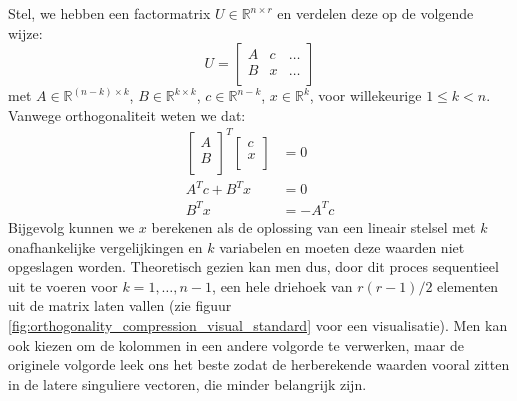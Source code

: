 Stel, we hebben een factormatrix $U \in \mathbb{R}^{n \times r}$ en verdelen deze op de volgende wijze:
\[
U = \begin{bmatrix}
A & c & \dots \\
B & x & \dots \\
\end{bmatrix}
\]
met $A \in \mathbb{R}^{(n-k) \times k}$, $B \in \mathbb{R}^{k \times k}$, $c \in \mathbb{R}^{n-k}$, $x \in \mathbb{R}^{k}$, voor willekeurige $1 \leq k < n$. Vanwege orthogonaliteit weten we dat:
\begin{align*}
\begin{bmatrix}
A \\
B \\
\end{bmatrix}^T
\begin{bmatrix}
c \\
x \\
\end{bmatrix}
&= 0 \\
A^T c + B^T x &= 0 \\
B^T x &= -A^T c
\end{align*}
Bijgevolg kunnen we $x$ berekenen als de oplossing van een lineair stelsel met $k$ onafhankelijke vergelijkingen en $k$ variabelen en moeten deze waarden niet opgeslagen worden. Theoretisch gezien kan men dus, door dit proces sequentieel uit te voeren voor $k = 1, \dots, n - 1$, een hele driehoek van $r (r - 1)/2$ elementen uit de matrix laten vallen (zie figuur \ref{fig:orthogonality_compression_visual_standard} voor een visualisatie). Men kan ook kiezen om de kolommen in een andere volgorde te verwerken, maar de originele volgorde leek ons het beste zodat de herberekende waarden vooral zitten in de latere singuliere vectoren, die minder belangrijk zijn.\\

